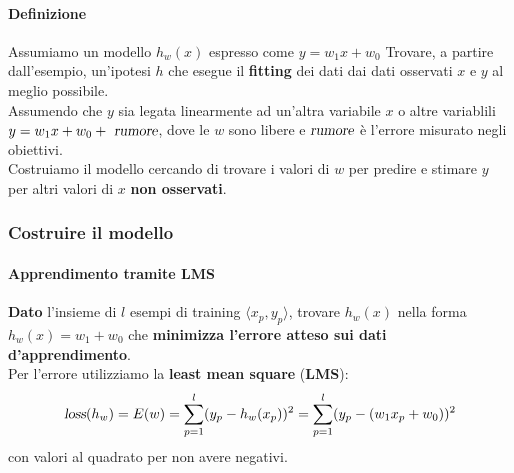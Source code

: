\documentclass[10pt]{book}
\begin{document}
\paragraph{Definizione} Assumiamo un modello $h_w(x)$ espresso come $y = w_1x + w_0$
Trovare, a partire dall'esempio, un'ipotesi $h$ che esegue il \textbf{fitting} dei dati dai dati osservati $x$ e $y$ al meglio possibile.\\
Assumendo che $y$ sia legata linearmente ad un'altra variabile $x$ o altre variablili $y= w_1x + w_0 + \textsl{ rumore}$, dove le $w$ sono libere e $\textsl{rumore}$ è l'errore misurato negli obiettivi.\\
Costruiamo il modello cercando di trovare i valori di $w$ per predire e stimare $y$ per altri valori di $x$ \textbf{non osservati}.
\subsubsection{Costruire il modello}
\paragraph{Apprendimento tramite LMS} \textbf{Dato} l'insieme di $l$ esempi di training $\langle x_p, y_p\rangle$, trovare $h_w(x)$ nella forma\\$h_w(x) = w_1 + w_0$ che \textbf{minimizza l'errore atteso sui dati d'apprendimento}.\\
Per l'errore utilizziamo la \textbf{least mean square} (\textbf{LMS}): $$\textsl{loss}(h_w) = E(w) = \sum_{p=1}^l (y_p - h_w(x_p))^2 = \sum_{p=1}^l (y_p - (w_1x_p + w_0))^2$$ con valori al quadrato per non avere negativi.
\end{document}
